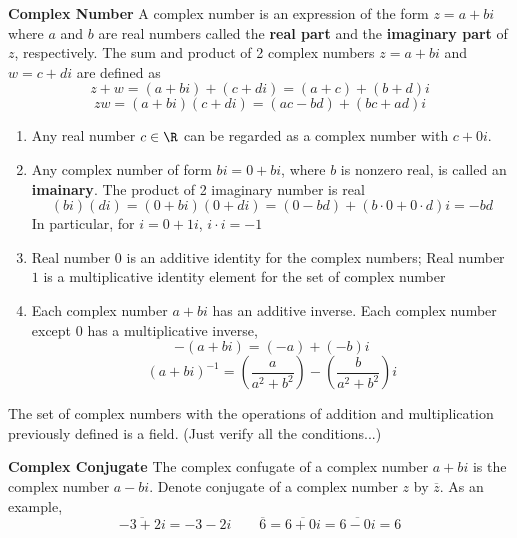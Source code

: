 \documentclass[11pt]{article}
\begin{document}
\begin{defn*}
    \textbf{Complex Number} A complex number is an expression of the form $z = a + bi$ where $a$ and $b$ are real numbers called the \textbf{real part} and the \textbf{imaginary part} of $z$, respectively. The sum and product of 2 complex numbers $z = a+bi$ and $w =c+di$ are defined as 
    \[
        z + w = (a+bi) + (c+di) = (a+c) + (b+d)i
    \]
    \[
        zw = (a+bi)(c+di) = (ac-bd) + (bc+ad)i
    \]
    \begin{enumerate}
        \item Any real number $c\in \R$ can be regarded as a complex number with $c + 0i$. 
        \item Any complex number of form $bi = 0 + bi$, where $b$ is nonzero  real, is called an \textbf{imainary}. The product of 2 imaginary number is real 
        \[
            (bi)(di) = (0 + bi)(0 + di) = (0-bd)  + (b\cdot 0 + 0\cdot d)i = -bd   
        \]
        In particular, for $i = 0 + 1i$, $i\cdot i = -1$
        \item Real number $0$ is an additive identity for the complex numbers; Real number $1$ is a multiplicative identity element for the set of complex number  
        \item Each complex number $a + bi$ has an additive inverse. Each complex number except 0 has a multiplicative inverse, 
        \[
            -(a + bi) = (-a) + (-b)i
        \]
        \[  
            (a+bi)^{-1} = (\frac{a}{a^2 + b^2}) - (\frac{b}{a^2+b^2})i    
        \]
    \end{enumerate}
\end{defn*}


\begin{theorem*}
    The set of complex numbers with the operations of addition and multiplication previously defined is a field. (Just verify all the conditions...)
\end{theorem*}


\begin{defn*}
    \textbf{Complex Conjugate} The complex confugate of a complex number $a+bi$ is the complex number $a-bi$. Denote conjugate of a complex number $z$ by $\overline{z}$. As an example, 
    \[
        \overline{-3 + 2i} = -3 - 2i \quad \quad 
        \overline{6} = \overline{6+0i} = \overline{6-0i} = 6
    \]
\end{defn*}
\end{document}
